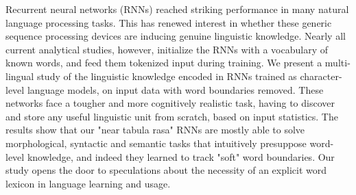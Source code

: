 Recurrent neural networks (RNNs) reached striking performance in many natural language processing tasks. This has renewed interest in whether these generic sequence processing devices are inducing genuine linguistic knowledge. Nearly all current analytical studies, however, initialize the RNNs with a vocabulary of known words, and feed them tokenized input during training. We present a multi-lingual study of the linguistic knowledge encoded in RNNs trained as character-level language models, on input data with word boundaries removed. These networks face a tougher and more cognitively realistic task, having to discover and store any useful linguistic unit from scratch, based on input statistics. The results show that our "near tabula rasa" RNNs are mostly able to solve morphological, syntactic and semantic tasks that intuitively presuppose word-level knowledge, and indeed they learned to track "soft" word boundaries. Our study opens the door to speculations about the necessity of an explicit word lexicon in language learning and usage.
